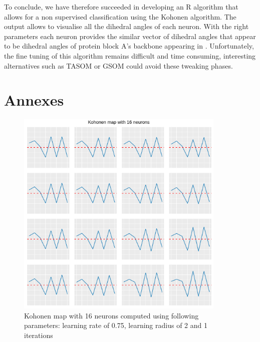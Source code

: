 \documentclass[11pt,a4paper]{article}
\begin{document}
    To conclude, we have therefore succeeded in developing an R algorithm that allows for a non supervised classification using the Kohonen algorithm. The output allows to visualise all the dihedral angles of each neuron. With the right parameters each neuron provides the similar vector of dihedral angles that appear to be dihedral angles of protein block A's backbone appearing in \cite{brevern_etchebest_hazout_2000}. Unfortunately, the fine tuning of this algorithm remains difficult and time consuming, interesting alternatives such as TASOM or GSOM could avoid these tweaking phases.
    
    
    
    
    
    \section{Annexes}
    \begin{figure}[h!]
        \centering
        \includegraphics[height=10cm]{img/mutliple_graph_learn_rate_0_75_2_1.png}
        \caption{Kohonen map with 16 neurons computed using following parameters: learning rate of 0.75, learning radius of 2 and 1 iterations}
        \label{fig:mutliple_graph_learn_rate_0_75_2_1}
    \end{figure}
\end{document}
